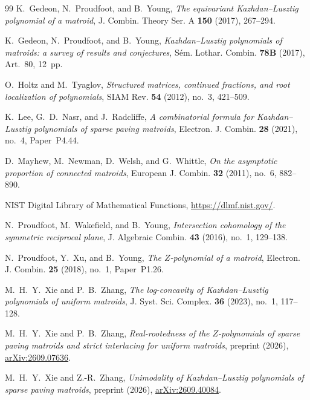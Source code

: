 \documentclass[10pt,a4paper]{article}
\numberwithin{equation}{section}
\theoremstyle{remark}\newtheorem{remark}[theorem]{Remark}
\begin{document}
\begin{thebibliography}{99}
K.~Gedeon, N.~Proudfoot, and B.~Young,
\emph{The equivariant Kazhdan--Lusztig polynomial of a matroid},
J. Combin. Theory Ser. A \textbf{150} (2017), 267--294.

K.~Gedeon, N.~Proudfoot, and B.~Young,
\emph{Kazhdan--Lusztig polynomials of matroids:
a survey of results and conjectures},
S\'em. Lothar. Combin. \textbf{78B} (2017), Art.~80, 12~pp.

O.~Holtz and M.~Tyaglov,
\emph{Structured matrices, continued fractions, and root localization of polynomials},
SIAM Rev. \textbf{54} (2012), no.~3, 421--509.

K.~Lee, G.~D.~Nasr, and J.~Radcliffe,
\emph{A combinatorial formula for Kazhdan--Lusztig polynomials of
sparse paving matroids},
Electron. J. Combin. \textbf{28} (2021), no.~4, Paper~P4.44.

D.~Mayhew, M.~Newman, D.~Welsh, and G.~Whittle,
\emph{On the asymptotic proportion of connected matroids},
European J. Combin. \textbf{32} (2011), no.~6, 882--890.

NIST Digital Library of Mathematical Functions,
\url{https://dlmf.nist.gov/}.

N.~Proudfoot, M.~Wakefield, and B.~Young,
\emph{Intersection cohomology of the symmetric reciprocal plane},
J. Algebraic Combin. \textbf{43} (2016), no.~1, 129--138.

N.~Proudfoot, Y.~Xu, and B.~Young,
\emph{The $Z$-polynomial of a matroid},
Electron. J. Combin. \textbf{25} (2018), no.~1, Paper~P1.26.

M.~H.~Y.~Xie and P.~B.~Zhang,
\emph{The log-concavity of Kazhdan--Lusztig polynomials of uniform matroids},
J. Syst. Sci. Complex. \textbf{36} (2023), no.~1, 117--128.

M.~H.~Y.~Xie and P.~B.~Zhang,
\emph{Real-rootedness of the $Z$-polynomials of sparse paving matroids
and strict interlacing for uniform matroids},
preprint (2026),
\href{https://arxiv.org/abs/2609.07636}{arXiv:2609.07636}.

M.~H.~Y.~Xie and Z.-R.~Zhang,
\emph{Unimodality of Kazhdan--Lusztig polynomials of sparse paving matroids},
preprint (2026),
\href{https://arxiv.org/abs/2609.40084}{arXiv:2609.40084}.

\end{thebibliography}
\end{document}
